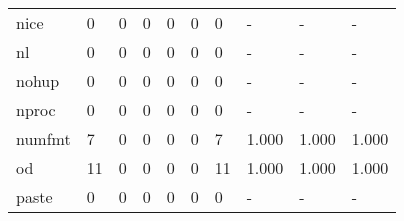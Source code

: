 \begin{longtable}{lp{1.3cm}p{1.3cm}p{1.3cm}p{1.3cm}p{1.3cm}p{1.3cm}p{1.3cm}p{1.3cm}p{1.3cm}}
nice      &                      0 &                                             0 &                                            0 &                                           0 &                                            0 &                                          0 &                                    - &                                      - &                                    - \\
nl        &                      0 &                                             0 &                                            0 &                                           0 &                                            0 &                                          0 &                                    - &                                      - &                                    - \\
nohup     &                      0 &                                             0 &                                            0 &                                           0 &                                            0 &                                          0 &                                    - &                                      - &                                    - \\
nproc     &                      0 &                                             0 &                                            0 &                                           0 &                                            0 &                                          0 &                                    - &                                      - &                                    - \\
numfmt    &                      7 &                                             0 &                                            0 &                                           0 &                                            0 &                                          7 &                                1.000 &                                  1.000 &                                1.000 \\
od        &                     11 &                                             0 &                                            0 &                                           0 &                                            0 &                                         11 &                                1.000 &                                  1.000 &                                1.000 \\
paste     &                      0 &                                             0 &                                            0 &                                           0 &                                            0 &                                          0 &                                    - &                                      - &                                    - \\

\end{longtable}
